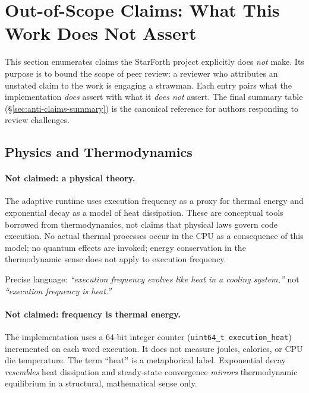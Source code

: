 
\section{Out-of-Scope Claims: What This Work Does Not Assert}

This section enumerates claims the StarForth project explicitly does \emph{not} make.
Its purpose is to bound the scope of peer review: a reviewer who attributes an
unstated claim to the work is engaging a strawman. Each entry pairs what
the implementation \emph{does} assert with what it \emph{does not} assert.
The final summary table (\S\ref{sec:anti-claims-summary}) is the canonical
reference for authors responding to review challenges.

\subsection{Physics and Thermodynamics}

\paragraph{Not claimed: a physical theory.}
The adaptive runtime uses execution frequency as a proxy for thermal energy
and exponential decay as a model of heat dissipation. These are conceptual
tools borrowed from thermodynamics, not claims that physical laws govern code
execution. No actual thermal processes occur in the CPU as a consequence of
this model; no quantum effects are invoked; energy conservation in the
thermodynamic sense does not apply to execution frequency.

Precise language: \emph{``execution frequency evolves like heat in a cooling
system,''} not \emph{``execution frequency is heat.''}

\paragraph{Not claimed: frequency is thermal energy.}
The implementation uses a 64-bit integer counter (\texttt{uint64\_t
execution\_heat}) incremented on each word execution. It does not measure
joules, calories, or CPU die temperature. The term ``heat'' is a metaphorical
label. Exponential decay \emph{resembles} heat dissipation and
steady-state convergence \emph{mirrors} thermodynamic equilibrium in a
structural, mathematical sense only.

